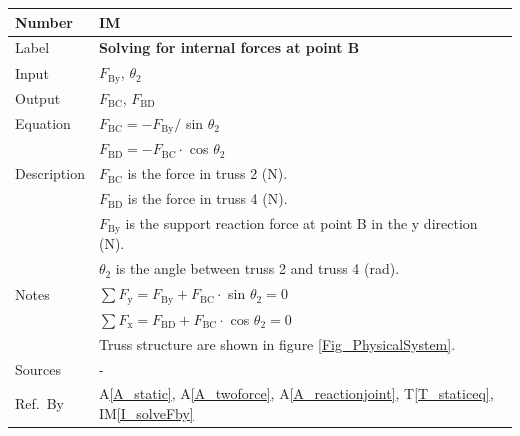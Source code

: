 \documentclass[12pt]{article}
\newcommand{\colAwidth}{0.13\textwidth}
\newcommand{\colBwidth}{0.82\textwidth}
\newcommand{\tref}[1]{T\ref{#1}}
\newcommand{\aref}[1]{A\ref{#1}}
\newcounter{instnum} %
\newcommand{\iref}[1]{IM\ref{#1}}
\begin{document}
\noindent
\begin{minipage}{\textwidth}
	\renewcommand*{\arraystretch}{1.5}
	\begin{tabular}{| p{\colAwidth} | p{\colBwidth}|}
		\hline
		\rowcolor[gray]{0.9}
		Number& IM{instnum}\theinstnum \label{I_solveB}\\
		\hline
		Label& \bf Solving for internal forces at point B\\
		\hline
		Input& $F_{\text{By}}$, $\theta_2$\\
		\hline
		Output& $F_{\text{{BC}}}$, $F_{\text{{BD}}}$\\
		\hline
		Equation& $F_{\text{{BC}}} = -F_{\text{By}} /$ sin $\theta_2$ \\
		&$F_{\text{{BD}}} = -F_{\text{{BC}}} \cdot$ cos $\theta_2$ \\
		\hline
		Description&$F_{\text{{BC}}}$ is the force in truss 2 (N).\\
		&$F_{\text{{BD}}}$ is the force in truss 4 (N).\\
		&$F_{\text{By}}$ is the support reaction force at point B in the y 
		direction (N).\\	
		&$\theta_2$ is the angle between truss 2 and truss 4 (\si{\radian}).\\
		\hline
		Notes& $\sum F_{\text{y}} = F_{\text{By}} + F_{\text{{BC}}} \cdot$ sin 
		$\theta_2 = 0$\\
		&$\sum F_{\text{x}} = F_{\text{BD}} + F_{\text{{BC}}} \cdot$ cos 
		$\theta_2 = 0$\\
		&Truss structure are shown in figure \ref{Fig_PhysicalSystem}.\\
		\hline
		Sources& - \\
		\hline
		Ref.\ By & \aref{A_static}, \aref{A_twoforce}, \aref{A_reactionjoint}, 
		\tref{T_staticeq}, \iref{I_solveFby}\\
		\hline
	\end{tabular}
\end{minipage}\\

~\newline
\end{document}
